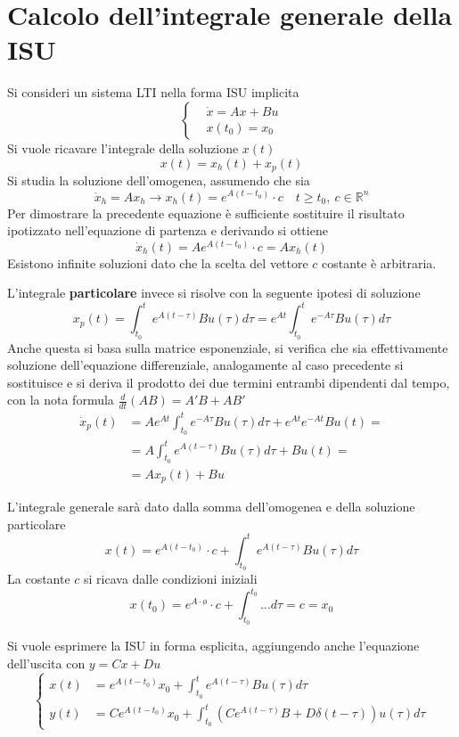\newpage
\section{Calcolo dell'integrale generale della ISU}
\label{sec:formule_lagrange}
Si consideri un sistema LTI nella forma ISU implicita
$$\left\{\begin{aligned}
&\dot{x} = Ax + Bu\\
&x(t_0) = x_0
\end{aligned}\right.$$
Si vuole ricavare l'integrale della soluzione $x(t)$
$$
x(t) = x_h(t) + x_p(t)
$$
Si studia la soluzione dell'omogenea, assumendo che sia
$$
\dot x_h = Ax_h \rightarrow x_h(t) = e^{A(t-t_0)}\cdot c \quad t\geq t_0,\
c\in\mathbb{R}^n
$$
Per dimostrare la precedente equazione è sufficiente sostituire il risultato
ipotizzato nell'equazione di partenza e derivando si ottiene
$$
\dot{x}_h(t) = Ae^{A(t-t_0)} \cdot c = Ax_h(t)
$$
Esistono infinite soluzioni dato che la scelta del vettore $c$ costante è
arbitraria.

L'integrale \textbf{particolare} invece si risolve con la seguente ipotesi di
soluzione
$$
x_p(t) = \int_{t_0}^t e^{A(t-\tau)}Bu(\tau)d\tau =
e^{At} \int_{t_0}^t e^{-A\tau}Bu(\tau)d\tau
$$
Anche questa si basa sulla matrice esponenziale, si verifica che sia
effettivamente soluzione dell'equazione differenziale, analogamente al caso
precedente si sostituisce e si deriva il prodotto dei due termini entrambi
dipendenti dal tempo, con la nota formula $\frac{d}{dt}(AB) = A'B + AB'$
$$\begin{aligned}
\dot{x}_p(t) &= Ae^{At} \int_{t_0}^t e^{-A\tau}Bu(\tau)d\tau +
e^{At}e^{-At}Bu(t) =\\
&=A \int_{t_0}^t e^{A(t-\tau)}Bu(\tau)d\tau + Bu(t) = \\
&= Ax_p(t) + Bu
\end{aligned}$$

L'integrale generale sarà dato dalla somma dell'omogenea e della soluzione
particolare
$$
x(t) = e^{A(t-t_0)}\cdot c + \int_{t_0}^t e^{A(t-\tau)}Bu(\tau)d\tau
$$
La costante $c$ si ricava dalle condizioni iniziali
$$
x(t_0) = e^{A\cdot\text{\o{}}}\cdot c + \int_{t_0}^{t_0}\dots d\tau = c = x_0
$$

\newpage
Si vuole esprimere la ISU in forma esplicita, aggiungendo anche l'equazione
dell'uscita con $y=Cx+Du$
$$
\left\{\begin{aligned}
x(t) &= e^{A(t-t_0)} x_0 + \int_{t_0}^{t} e^{A(t-\tau)}Bu(\tau)d\tau\\
y(t) &= Ce^{A(t-t_0)}x_0 + \int_{t_0}^t \left(Ce^{A(t-\tau)}B +
D\delta(t-\tau) \right)u(\tau)d\tau
\end{aligned}\right.
$$

